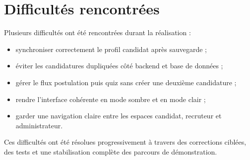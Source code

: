 \section{Difficultés rencontrées}

\noindent
Plusieurs difficultés ont été rencontrées durant la réalisation :

\begin{itemize}
    \item synchroniser correctement le profil candidat après sauvegarde ;
    \item éviter les candidatures dupliquées côté backend et base de données ;
    \item gérer le flux postulation puis quiz sans créer une deuxième candidature ;
    \item rendre l'interface cohérente en mode sombre et en mode clair ;
    \item garder une navigation claire entre les espaces candidat, recruteur et administrateur.
\end{itemize}

\noindent
Ces difficultés ont été résolues progressivement à travers des corrections ciblées, des tests et une stabilisation complète des parcours de démonstration.
